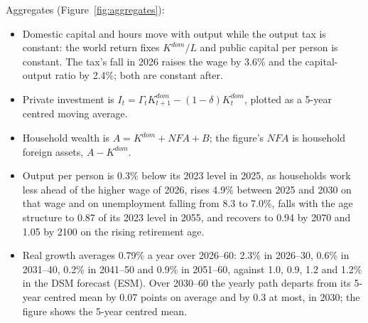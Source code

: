 \documentclass[11pt,a4paper]{article}
\begin{document}
\noindent\footnotesize
Aggregates (Figure~\ref{fig:aggregates}):
\begin{itemize}
\item Domestic capital and hours move with output while the output tax is
  constant: the world return fixes $K^{dom}/L$ and public capital per person
  is constant. The tax's fall in 2026 raises the wage by 3.6\% and the
  capital-output ratio by 2.4\%; both are constant after.
\item Private investment is $I_t=\Gamma_t K^{dom}_{t+1}-(1-\delta)K^{dom}_t$,
  plotted as a 5-year centred moving average.
\item Household wealth is $A=K^{dom}+NFA+B$; the figure's $NFA$ is household
  foreign assets, $A-K^{dom}$.
\item Output per person is 0.3\% below its 2023 level in 2025, as
  households work less ahead of the higher wage of 2026, rises 4.9\%
  between 2025 and 2030 on that wage and on unemployment falling from 8.3 to
  7.0\%, falls with the age structure to 0.87 of its 2023 level in 2055, and
  recovers to 0.94 by 2070 and 1.05 by 2100 on the rising retirement age.
\item Real growth averages 0.79\% a year over 2026--60: 2.3\% in 2026--30,
  0.6\% in 2031--40, 0.2\% in 2041--50 and 0.9\% in 2051--60, against 1.0,
  0.9, 1.2 and 1.2\% in the DSM forecast (ESM). Over 2030--60 the yearly
  path departs from its 5-year centred mean by 0.07 points on average and
  by 0.3 at most, in 2030; the figure shows the 5-year centred mean.
\end{itemize}
\end{document}
